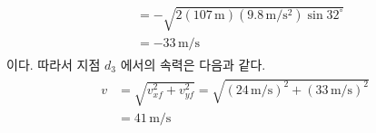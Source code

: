\documentclass[floatfix,nofootinbib,superscriptaddress,fleqn]{revtex4-2}
\begin{document}
\begin{itemize}
\begin{align}
\begin{split}
      &=-\sqrt{2(107\,\mathrm{m})
      (9.8\,\mathrm{m/s^2})\sin{32^\circ}} \\
      &=-33\,\mathrm{m/s}
    \end{split}
  \end{align}
  이다. 따라서 지점 $d_3$ 에서의 속력은 다음과 같다.
  \begin{align}
    \begin{split}
      v &= \sqrt{v_{xf}^2+v_{yf}^2} 
      = \sqrt{(24\,\mathrm{m/s})^2+(33\,\mathrm{m/s})^2} \\
      &= 41\,\mathrm{m/s}
    \end{split}
  \end{align}
\end{itemize} 
\end{document}
